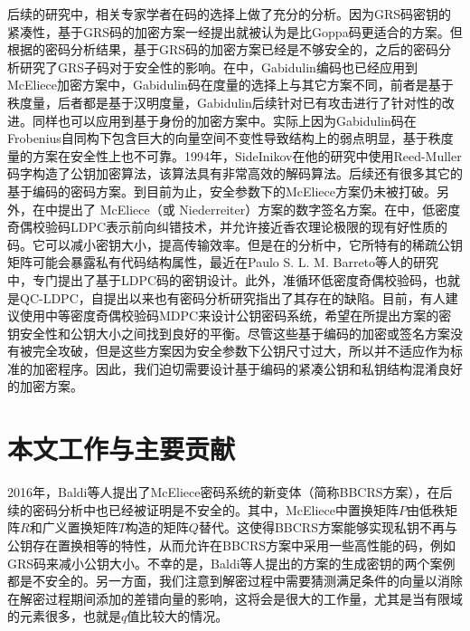 后续的研究中，相关专家学者在码的选择上做了充分的分析。因为GRS码密钥的紧凑性，基于GRS码的加密方案一经提出就被认为是比Goppa码更适合的方案。但根据\cite{Couvreur2013Distinguisher, Beelen2018StructuralPO, Lavauzelle2019CryptanalysisOA}的密码分析结果，基于GRS码的加密方案已经是不够安全的，之后的密码分析研究了GRS子码对于安全性的影响\cite{Wieschebrink2010Cryptanalysis}。在\cite{Loidreau2017A}中，Gabidulin编码也已经应用到McEliece加密方案中，Gabidulin码在度量的选择上与其它方案不同，前者是基于秩度量，后者都是基于汉明度量，Gabidulin后续针对已有攻击进行了针对性的改进\cite{Gabidulin2003Reducible, Gabidulin2001Modified, Berger2004Designing, Ding2014On}。同样也可以应用到基于身份的加密方案中\cite{Gaborit2017Identity}。实际上因为Gabidulin码在Frobenius自同构下包含巨大的向量空间不变性导致结构上的弱点明显\cite{Gibson1995Severely, Gibson1996The, Overbeck2008Structural, Coggia2019OnTS}，基于秩度量的方案在安全性上也不可靠。1994年，SideInikov在他的研究中使用Reed-Muller码字构造了公钥加密算法\cite{Sidel1994Open}，该算法具有非常高效的解码算法。后续还有很多其它的基于编码的密码方案。到目前为止，安全参数下的McEliece方案仍未被打破。另外，在\cite{Courtois2001How}中提出了 McEliece（或 Niederreiter）方案的数字签名方案。在\cite{Baldi2007Cryptanalysis}中，低密度奇偶校验码LDPC表示前向纠错技术，并允许接近香农理论极限的现有好性质的码。它可以减小密钥大小，提高传输效率。但是在\cite{Baldi2008A}的分析中，它所特有的稀疏公钥矩阵可能会暴露私有代码结构属性，最近在Paulo S. L. M. Barreto等人的研究中\cite{Barreto2017CAKE}，专门提出了基于LDPC码的密钥设计。此外，准循环低密度奇偶校验码，也就是QC-LDPC\cite{Baldi2013Optimization}，自提出以来也有密码分析研究\cite{Otmani2010Cryptanalysis}指出了其存在的缺陷。目前，有人建议使用中等密度奇偶校验码MDPC来设计公钥密码系统\cite{Misoczki2013MDPC, Heyse2013Smaller}，希望在所提出方案的密钥安全性和公钥大小之间找到良好的平衡。尽管这些基于编码的加密或签名方案没有被完全攻破，但是这些方案因为安全参数下公钥尺寸过大，所以并不适应作为标准的加密程序。因此，我们迫切需要设计基于编码的紧凑公钥和私钥结构混淆良好的加密方案。

\section{本文工作与主要贡献}
2016年，Baldi等人提出了McEliece密码系统的新变体（简称BBCRS方案），在后续的密码分析中也已经被证明是不安全的。其中，McEliece中置换矩阵$P$由低秩矩阵$R$和广义置换矩阵$T$构造的矩阵$Q$替代。这使得BBCRS方案能够实现私钥不再与公钥存在置换相等的特性，从而允许在BBCRS方案中采用一些高性能的码，例如GRS码来减小公钥大小。不幸的是，Baldi等人提出的方案的生成密钥的两个案例都是不安全的。另一方面，我们注意到解密过程中需要猜测满足条件的向量以消除在解密过程期间添加的差错向量的影响，这将会是很大的工作量，尤其是当有限域的元素很多，也就是$q$值比较大的情况。

